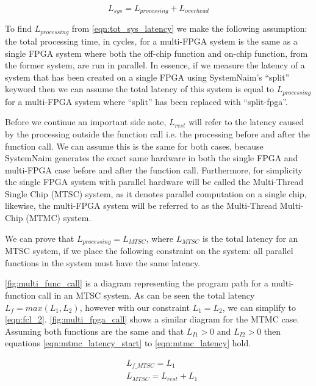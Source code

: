 \begin{equation}
    L_{sys} = L_{processing} + L_{overhead}
    \label{eqn:tot_sys_latency}
\end{equation}

To find $L_{processing}$ from \autoref{eqn:tot_sys_latency} we make the following assumption: the total processing time, in cycles, for a multi-FPGA system is the same as a single FPGA system where both the off-chip function and on-chip function, from the former system, are run in parallel. In essence, if we measure the latency of a system that has been created on a single FPGA using SystemNaim's “split” keyword then we can assume the total latency of this system is equal to $L_{processing}$ for a multi-FPGA system where “split” has been replaced with “split-fpga”.

Before we continue an important side note, $L_{rest}$ will refer to the latency caused by the processing outside the function call i.e. the processing before and after the function call. We can assume this is the same for both cases, because SystemNaim generates the exact same hardware in both the single FPGA and multi-FPGA case before and after the function call. Furthermore, for simplicity the single FPGA system with parallel hardware will be called the Multi-Thread Single Chip (MTSC) system, as it denotes parallel computation on a single chip, likewise, the multi-FPGA system will be referred to as the Multi-Thread Multi-Chip (MTMC) system. 

We can prove that $L_{processing} = L_{MTSC}$, where $L_{MTSC}$ is the total latency for an MTSC system, if we place the following constraint on the system: all parallel functions in the system must have the same latency.

\autoref{fig:multi_func_call} is a diagram representing the program path for a multi-function call in an MTSC system. As can be seen the total latency $L_f = max(L_1,L_2)$, however with our constraint $L_1 = L_2$, we can simplify to \autoref{eqn:fcl_2}. \autoref{fig:multi_fpga_call} shows a similar diagram for the MTMC case. Assuming both functions are the same and that $L_{I1} > 0 \text{ and } L_{I2} > 0 $ then equations \ref{eqn:mtmc_latency_start} to \ref{eqn:mtmc_latency} hold. 

\begin{align}
    &L_{f\_MTSC} = L_1 \label{eqn:fcl_1} \\
    &L_{MTSC} = L_{rest} + L_1 \label{eqn:fcl_2}
\end{align}

